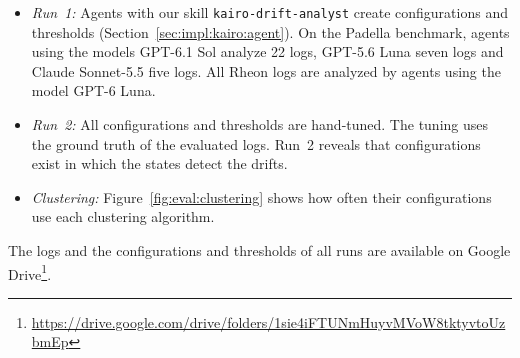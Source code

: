 \begin{itemize}
	\item \emph{Run~1:} Agents with our skill \texttt{kairo-drift-analyst} create configurations and thresholds (Section~\ref{sec:impl:kairo:agent}). On the Padella benchmark, agents using the models GPT-6.1 Sol analyze 22 logs, GPT-5.6 Luna seven logs and Claude Sonnet-5.5 five logs. All Rheon logs are analyzed by agents using the model GPT-6 Luna.
	\item \emph{Run~2:} All configurations and thresholds are hand-tuned. The tuning uses the ground truth of the evaluated logs. Run~2 reveals that configurations exist in which the states detect the drifts.
	\item \emph{Clustering:} Figure~\ref{fig:eval:clustering} shows how often their configurations use each clustering algorithm.
\end{itemize}

The logs and the configurations and thresholds of all runs are available on Google Drive\footnote{\url{https://drive.google.com/drive/folders/1sie4iFTUNmHuyvMVoW8tktyvtoUzbmEp}}.

